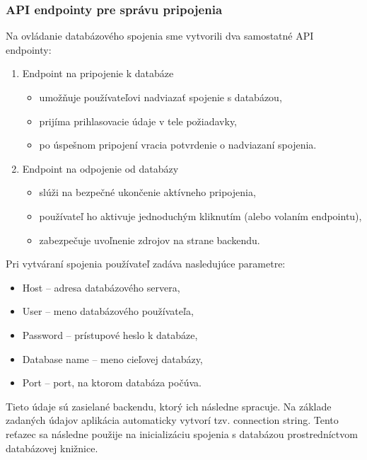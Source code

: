 \documentclass[a4paper, 12pt]{article}
\begin{document}
\subsubsection{API endpointy pre správu pripojenia}

Na ovládanie databázového spojenia sme vytvorili dva samostatné API endpointy:

\begin{enumerate}
    \item Endpoint na pripojenie k databáze
    \begin{itemize}
        \item umožňuje používateľovi nadviazať spojenie s databázou,
        \item prijíma prihlasovacie údaje v tele požiadavky,
        \item po úspešnom pripojení vracia potvrdenie o nadviazaní spojenia.
    \end{itemize}
    \item Endpoint na odpojenie od databázy
    \begin{itemize}
        \item slúži na bezpečné ukončenie aktívneho pripojenia,
        \item používateľ ho aktivuje jednoduchým kliknutím (alebo volaním endpointu),
        \item zabezpečuje uvoľnenie zdrojov na strane backendu.\newline
    \end{itemize}
\end{enumerate}
\clearpage
\noindent
Pri vytváraní spojenia používateľ zadáva nasledujúce parametre:

\begin{itemize}
    \item Host – adresa databázového servera,
    \item User – meno databázového používateľa,
    \item Password – prístupové heslo k databáze,
    \item Database name – meno cieľovej databázy,
    \item Port – port, na ktorom databáza počúva.
\end{itemize}

\noindent
Tieto údaje sú zasielané backendu, ktorý ich následne spracuje.
Na základe zadaných údajov aplikácia automaticky vytvorí tzv. connection string.
Tento reťazec sa následne použije na inicializáciu spojenia s databázou prostredníctvom databázovej knižnice.
\end{document}
